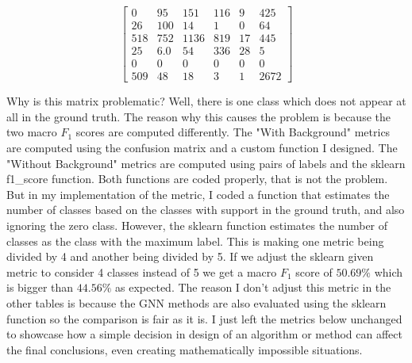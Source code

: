 \[
\begin{bmatrix}
0 & 95 & 151 & 116 & 9 & 425 \\
26 & 100 & 14 & 1 & 0 & 64 \\
518 & 752 & 1136 & 819 & 17 & 445 \\
25 & 6.0 & 54 & 336 & 28 & 5 \\
0 & 0 & 0 & 0 & 0 & 0 \\
509 & 48 & 18 & 3 & 1 & 2672
\end{bmatrix}
\]

\noindent Why is this matrix problematic? Well, there is one class which does not appear at all in the ground truth. The reason why this causes the problem is because the two macro $F_1$ scores are computed differently. The "With Background" metrics are computed using the confusion matrix and a custom function I designed. The "Without Background" metrics are computed using pairs of labels and the sklearn f1\_score function. Both functions are coded properly, that is not the problem. But in my implementation of the metric, I coded a function that estimates the number of classes based on the classes with support in the ground truth, and also ignoring the zero class. However, the sklearn function estimates the number of classes as the class with the maximum label. This is making one metric being divided by 4 and another being divided by 5. If we adjust the sklearn given metric to consider 4 classes instead of 5 we get a macro $F_1$ score of $50.69\%$ which is bigger than $44.56\%$ as expected. The reason I don't adjust this metric in the other tables is because the GNN methods are also evaluated using the sklearn function so the comparison is fair as it is. I just left the metrics below unchanged to showcase how a simple decision in design of an algorithm or method can affect the final conclusions, even creating mathematically impossible situations.


